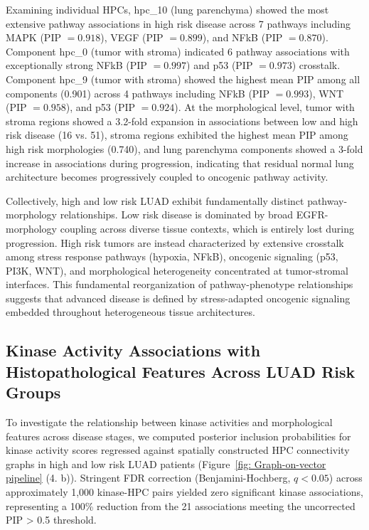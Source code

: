 \documentclass[pdflatex,article,12pt]{article}
\begin{document}
Examining individual HPCs, hpc\_10 (lung parenchyma) showed the most extensive pathway associations in high risk disease across 7 pathways including MAPK (PIP $= 0.918$), VEGF (PIP $= 0.899$), and NFkB (PIP $= 0.870$). Component hpc\_0 (tumor with stroma) indicated 6 pathway associations with exceptionally strong NFkB (PIP $= 0.997$) and p53 (PIP $= 0.973$) crosstalk. Component hpc\_9 (tumor with stroma) showed the highest mean PIP among all components (0.901) across 4 pathways including NFkB (PIP $= 0.993$), WNT (PIP $= 0.958$), and p53 (PIP $= 0.924$). At the morphological level, tumor with stroma regions showed a 3.2-fold expansion in associations between low and high risk disease (16 vs. 51), stroma regions exhibited the highest mean PIP among high risk morphologies (0.740), and lung parenchyma components showed a 3-fold increase in associations during progression, indicating that residual normal lung architecture becomes progressively coupled to oncogenic pathway activity.

Collectively, high and low risk LUAD exhibit fundamentally distinct pathway-morphology relationships. Low risk disease is dominated by broad EGFR-morphology coupling across diverse tissue contexts, which is entirely lost during progression. High risk tumors are instead characterized by extensive crosstalk among stress response pathways (hypoxia, NFkB), oncogenic signaling (p53, PI3K, WNT), and morphological heterogeneity concentrated at tumor-stromal interfaces. This fundamental reorganization of pathway-phenotype relationships suggests that advanced disease is defined by stress-adapted oncogenic signaling embedded throughout heterogeneous tissue architectures.

\subsection{Kinase Activity Associations with Histopathological Features Across LUAD Risk Groups}

To investigate the relationship between kinase activities and morphological features across disease stages, we computed posterior inclusion probabilities for kinase activity scores regressed against spatially constructed HPC connectivity graphs in high and low risk LUAD patients (Figure~\ref{fig: Graph-on-vector pipeline} (4. b)). Stringent FDR correction (Benjamini-Hochberg, $q < 0.05$) across approximately 1,000 kinase-HPC pairs yielded zero significant kinase associations, representing a 100\% reduction from the 21 associations meeting the uncorrected PIP > 0.5 threshold.
\end{document}
